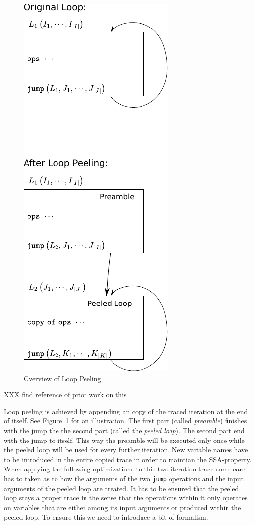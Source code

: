 \documentclass[preprint]{sigplanconf}
\begin{document}
\begin{figure}
\begin{center}
\includegraphics[scale=1]{figures/overview}
\end{center}
\caption{Overview of Loop Peeling}
\label{fig:overview}
\end{figure}

XXX find reference of prior work on this

Loop peeling is achieved by appending an copy of the traced iteration at
the end of itself. See Figure~\ref{fig:overview} for an illustration.
The first part (called \emph{preamble}) finishes with the jump the the second part
(called the \emph{peeled loop}). The second part end with the jump to itself. This way
the preamble will be executed only once while the peeled loop will
be used for every further iteration. New variable names have to be
introduced in the entire copied trace in order to maintian the SSA-property.
When applying the following optimizations to this two-iteration trace
some care has to taken as to how the arguments of the two
\lstinline{jump} operations and the input arguments of the peeled loop are
treated. It has to be ensured that the peeled loop stays a proper
trace in the sense that the operations within it only operates on
variables that are either among its input arguments 
or produced within the peeled loop. To ensure this we need
to introduce a bit of formalism.
\end{document}
